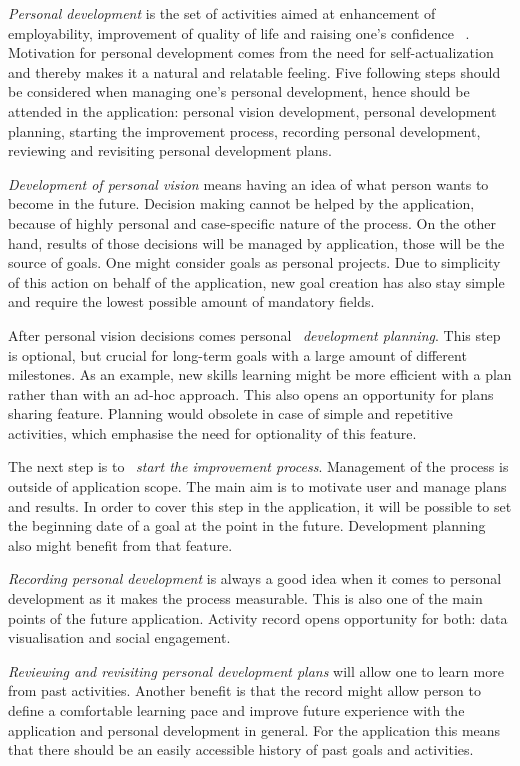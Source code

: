 \textit{Personal development} is the set of activities aimed at enhancement of employability, improvement of quality of life and raising one's confidence ~\cite{what-is-personal-development}.
Motivation for personal development comes from the need for self-actualization and thereby makes it a natural and relatable feeling.
Five following steps should be considered when managing one's personal development, hence should be attended in the application:
personal vision development, personal development planning, starting the improvement process, recording personal development, reviewing and revisiting personal development plans.

\textit{Development of personal vision} means having an idea of what person wants to become in the future.
Decision making cannot be helped by the application, because of highly personal and case-specific nature of the process.
On the other hand, results of those decisions will be managed by application, those will be the source of goals.
One might consider goals as personal projects.
Due to simplicity of this action on behalf of the application, new goal creation has also stay simple and require the lowest possible amount of mandatory fields.

After personal vision decisions comes personal ~\textit{development planning}.
This step is optional, but crucial for long-term goals with a large amount of different milestones.
As an example, new skills learning might be more efficient with a plan rather than with an ad-hoc approach.
This also opens an opportunity for plans sharing feature.
Planning would obsolete in case of simple and repetitive activities, which emphasise the need for optionality of this feature.

The next step is to ~\textit{start the improvement process}.
Management of the process is outside of application scope.
The main aim is to motivate user and manage plans and results.
In order to cover this step in the application, it will be possible to set the beginning date of a goal at the point in the future.
Development planning also might benefit from that feature.

\textit{Recording personal development} is always a good idea when it comes to personal development as it makes the process measurable.
This is also one of the main points of the future application.
Activity record opens opportunity for both: data visualisation and social engagement.

\textit{Reviewing and revisiting personal development plans} will allow one to learn more from past activities.
Another benefit is that the record might allow person to define a comfortable learning pace and improve future experience with the application and personal development in general.
For the application this means that there should be an easily accessible history of past goals and activities.

